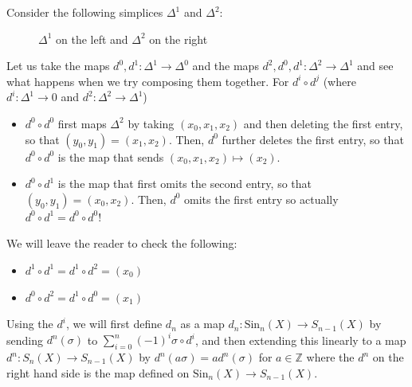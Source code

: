 \documentclass[12pt,reqno]{amsart}
\numberwithin{theorem}{section}
\theoremstyle{definition}
\theoremstyle{remark}
\numberwithin{equation}{section}
\newcommand{\Z}{\mathbb Z}
\theoremstyle{definition}
\newcommand{\Sin}{\mathrm{Sin}}
\begin{document}
\begin{example}
    Consider the following simplices $\Delta^1$ and $\Delta^2$:
    \begin{center}
    \begin{figure}[h]
        \centering
        
    \quad \quad
  \caption{$\Delta^1$ on the left and $\Delta^2$ on the right}
  \end{figure}
    \end{center}
    Let us take the maps $d^0,d^1:\Delta^1 \rightarrow \Delta^0$ and the maps $d^2,d^0,d^1:\Delta^2 \rightarrow \Delta^1$ and see what happens when we try composing them together. For $d^i\circ d^j$ (where $d^i: \Delta^1 \rightarrow 0$ and $d^2:\Delta^2 \rightarrow \Delta^1$)
    \begin{itemize}
        \item $d^0\circ d^0$ first maps $\Delta^2$ by taking $(x_0,x_1,x_2)$ and then deleting the first entry, so that $(y_0,y_1)=(x_1,x_2)$. Then, $d^0$ further deletes the first entry, so that $d^0\circ d^0$ is the map that sends $(x_0,x_1,x_2)\mapsto (x_2)$.
        \item $d^0 \circ d^1$ is the map that first omits the second entry, so that $(y_0,y_1)=(x_0,x_2)$. Then, $d^0$ omits the first entry so actually $d^0\circ d^1 = d^0\circ d^0$!
    \end{itemize}
    We will leave the reader to check the following:
    \begin{itemize}
        \item $d^1 \circ d^1 = d^1 \circ d^2 = (x_0)$
        \item $d^0 \circ d^2 = d^1 \circ d^0 = (x_1)$
    \end{itemize}
\end{example}
Using the $d^i$, we will first define $d_n$ as a map $d_n:\Sin_n(X)\rightarrow S_{n-1}(X)$ by sending $d^n(\sigma)$ to $\displaystyle \sum_{i=0}^n (-1)^{i}\sigma \circ d^i$, and then extending this linearly to a map $d^n:S_n(X)\rightarrow S_{n-1}(X)$ by $d^n(a\sigma ) = ad^n(\sigma)$ for $a \in \Z$ where the $d^n$ on the right hand side is the map defined on $\Sin_n(X)\rightarrow S_{n-1}(X)$. 
\end{document}
